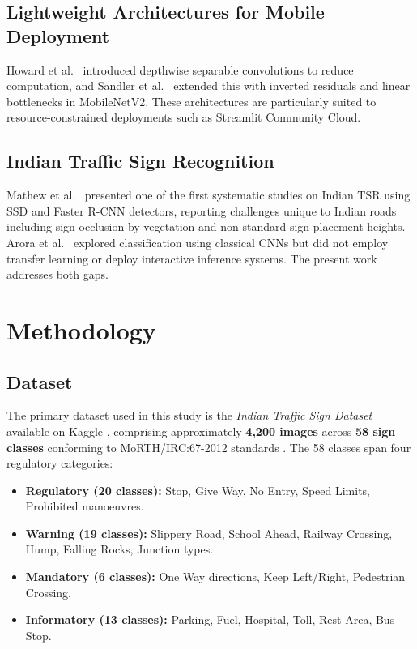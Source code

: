 \documentclass[journal,10pt,twocolumn]{IEEEtran}
\begin{document}
\subsection{Lightweight Architectures for Mobile Deployment}

Howard et al.\ \cite{howard2017mobilenets} introduced depthwise separable
convolutions to reduce computation, and Sandler et al.\
\cite{sandler2018mobilenetv2} extended this with inverted residuals and
linear bottlenecks in MobileNetV2. These architectures are particularly
suited to resource-constrained deployments such as Streamlit Community Cloud.

\subsection{Indian Traffic Sign Recognition}

Mathew et al.\ \cite{mathew2021indian} presented one of the first systematic
studies on Indian TSR using SSD and Faster R-CNN detectors, reporting challenges
unique to Indian roads including sign occlusion by vegetation and non-standard
sign placement heights. Arora et al.\ \cite{arora2019indian} explored
classification using classical CNNs but did not employ transfer learning or
deploy interactive inference systems. The present work addresses both gaps.

\section{Methodology}
\label{sec:methodology}

\subsection{Dataset}

The primary dataset used in this study is the \textit{Indian Traffic Sign
Dataset} available on Kaggle \cite{kaggle_indian}, comprising approximately
\textbf{4,200 images} across \textbf{58 sign classes} conforming to
MoRTH/IRC:67-2012 standards \cite{morth_irc2012}. The 58 classes span four
regulatory categories:

\begin{itemize}[nosep,leftmargin=*]
  \item \textbf{Regulatory (20 classes):} Stop, Give Way, No Entry, Speed Limits,
        Prohibited manoeuvres.
  \item \textbf{Warning (19 classes):} Slippery Road, School Ahead, Railway
        Crossing, Hump, Falling Rocks, Junction types.
  \item \textbf{Mandatory (6 classes):} One Way directions, Keep Left/Right,
        Pedestrian Crossing.
  \item \textbf{Informatory (13 classes):} Parking, Fuel, Hospital, Toll,
        Rest Area, Bus Stop.
\end{itemize}
\end{document}

